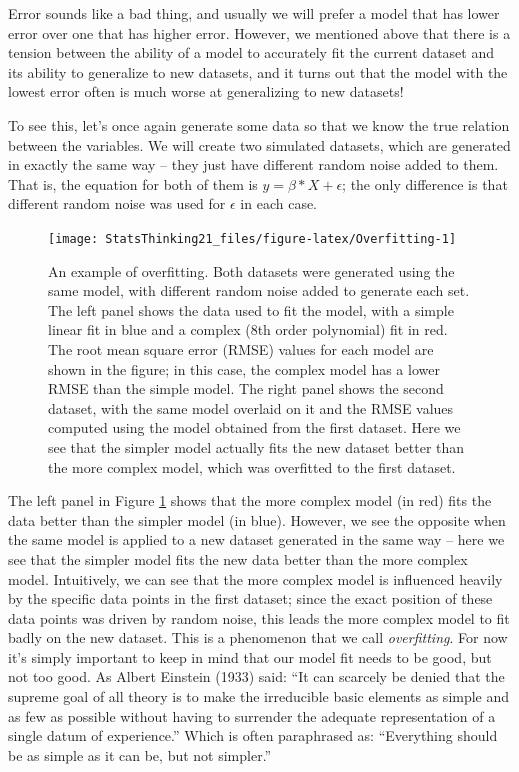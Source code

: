 \documentclass[12pt,]{book}
\theoremstyle{definition}
\theoremstyle{definition}
\theoremstyle{definition}
\theoremstyle{remark}
\begin{document}
Error sounds like a bad thing, and usually we will prefer a model that has lower error over one that has higher error. However, we mentioned above that there is a tension between the ability of a model to accurately fit the current dataset and its ability to generalize to new datasets, and it turns out that the model with the lowest error often is much worse at generalizing to new datasets!

To see this, let's once again generate some data so that we know the true relation between the variables. We will create two simulated datasets, which are generated in exactly the same way -- they just have different random noise added to them. That is, the equation for both of them is \(y = \beta * X + \epsilon\); the only difference is that different random noise was used for \(\epsilon\) in each case.

\begin{figure}
\texttt{[image: StatsThinking21\_files/figure-latex/Overfitting-1]} \caption{An example of overfitting. Both datasets were generated using the same model, with different random noise added to generate each set.  The left panel shows the data used to fit the model, with a simple linear fit in blue and a complex (8th order polynomial) fit in red.  The root mean square error (RMSE) values for each model are shown in the figure; in this case, the complex model has a lower RMSE than the simple model.  The right panel shows the second dataset, with the same model overlaid on it and the RMSE values computed using the model obtained from the first dataset.  Here we see that the simpler model actually fits the new dataset better than the more complex model, which was overfitted to the first dataset.}\label{fig:Overfitting}
\end{figure}

The left panel in Figure \ref{fig:Overfitting} shows that the more complex model (in red) fits the data better than the simpler model (in blue). However, we see the opposite when the same model is applied to a new dataset generated in the same way -- here we see that the simpler model fits the new data better than the more complex model. Intuitively, we can see that the more complex model is influenced heavily by the specific data points in the first dataset; since the exact position of these data points was driven by random noise, this leads the more complex model to fit badly on the new dataset. This is a phenomenon that we call \emph{overfitting}. For now it's simply important to keep in mind that our model fit needs to be good, but not too good. As Albert Einstein (1933) said: ``It can scarcely be denied that the supreme goal of all theory is to make the irreducible basic elements as simple and as few as possible without having to surrender the adequate representation of a single datum of experience.'' Which is often paraphrased as: ``Everything should be as simple as it can be, but not simpler.''
\end{document}
